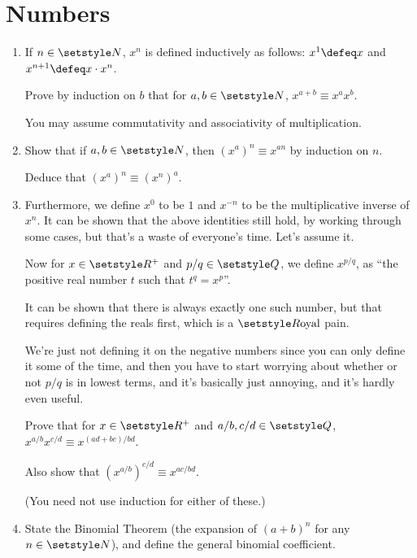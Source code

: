 \section{Numbers}

\begin{enumerate}
 \item
  If \(n \in \Naturals\), \(x^n\) is defined inductively as follows:
  \(x^1 \defeq x\) and \(x^{n + 1} \defeq x \cdot x^n\).

  Prove by induction on \(b\) that for \(a, b \in \Naturals\),
  \(x^{a + b} \equiv x^a x^b\).

  You may assume commutativity and associativity of multiplication.
 \item
  Show that if \(a, b \in \Naturals\), then
  \((x^a)^n \equiv x^{an}\) by induction on \(n\).

  Deduce that \((x^a)^n \equiv (x^n)^a\).
 \item
  Furthermore, we define \(x^0\) to be \(1\) and
  \(x^{-n}\) to be the multiplicative inverse of \(x^n\). It can be shown that
  the above identities still hold, by working through some cases, but that's a
  waste of everyone's time. Let's assume it.

  Now for \(x \in \Reals^+\) and \(p/q \in \Rationals\), we define \(x^{p/q}\),
  as ``the positive real number \(t\) such that \(t^q = x^p\)''.

  It can be shown that there is always exactly one such number, but that
  requires defining the reals first, which is a \(\Reals\text{oyal}\) pain.

  We're just not defining it on the negative numbers since you can only define
  it some of the time, and then you have to start worrying about whether or not
  \(p/q\) is in lowest terms, and it's basically just annoying, and it's hardly
  even useful.

  Prove that for \(x \in \Reals^+\) and \(a/b, c/d \in \Rationals\),
  \(x^{a/b} x^{c/d} \equiv x^{(ad + bc)/bd}\).

  Also show that \((x^{a/b})^{c/d} \equiv x^{ac/bd}\).

  (You need not use induction for either of these.)
 \item
  State the Binomial Theorem
  (the expansion of \((a + b)^n\) for any \(n \in \Naturals\)), and define the
  general binomial coefficient.


\end{enumerate}
